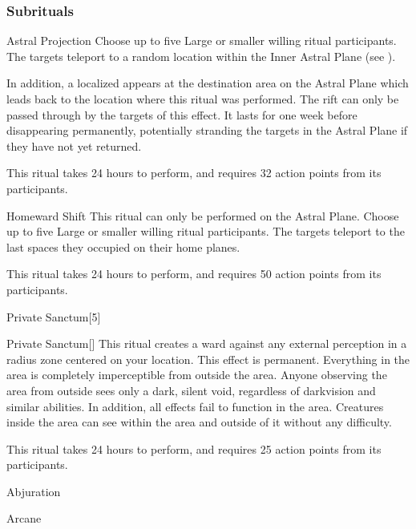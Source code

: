 \subsubsection{Subrituals}


\begin{ability}[\nth{4}]{Astral Projection}
Choose up to five Large or smaller willing ritual participants.
The targets teleport to a random location within the Inner Astral Plane (see ).

In addition, a localized  appears at the destination area on the Astral Plane which leads back to the location where this ritual was performed.
The rift can only be passed through by the targets of this effect.
It lasts for one week before disappearing permanently, potentially stranding the targets in the Astral Plane if they have not yet returned.

This ritual takes 24 hours to perform, and requires 32 action points from its participants.
\end{ability}
\vspace{0.25em}


\begin{ability}[\nth{5}]{Homeward Shift}
This ritual can only be performed on the Astral Plane.
Choose up to five Large or smaller willing ritual participants.
The targets teleport to the last spaces they occupied on their home planes.

This ritual takes 24 hours to perform, and requires 50 action points from its participants.
\end{ability}
\vspace{0.25em}


\begin{spellsection}{Private Sanctum}[5]


\begin{ability}{Private Sanctum}[]
This ritual creates a ward against any external perception in a \arealarge radius zone centered on your location.
This effect is permanent.
Everything in the area is completely imperceptible from outside the area.
Anyone observing the area from outside sees only a dark, silent void, regardless of darkvision and similar abilities.
In addition, all  effects fail to function in the area.
Creatures inside the area can see within the area and outside of it without any difficulty.

This ritual takes 24 hours to perform, and requires 25 action points from its participants.
\end{ability}




 Abjuration

 Arcane
\end{spellsection}



